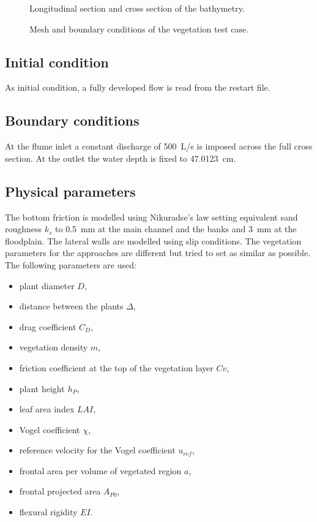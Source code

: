 \begin{figure}[h!]
\centering
{}

\caption{Longitudinal section and cross section of the bathymetry.}
\label{t2d:vegetation:bathy}
\end{figure}

\begin{figure}[h!]
\centering
{}
\caption{Mesh and boundary conditions of the vegetation test case.}
\label{t2d:vegetation:mesh}
\end{figure}

\subsection{Initial condition}

As initial condition, a fully developed flow is read from the restart file.

\subsection{Boundary conditions}

At the flume inlet a constant discharge of 500~L/s is imposed across the full
cross section. At the outlet the water depth is fixed to 47.0123~cm.

\subsection{Physical parameters}

The bottom friction is modelled using Nikuradse's law setting equivalent sand
roughness $k_s$ to 0.5~mm at the main channel and the banks and 3~mm at the floodplain.
The lateral walls are modelled using slip conditions.
The vegetation parameters for the approaches are different but tried to set
as similar as possible. The following parameters are used: 
\begin{itemize}
\item plant diameter $D$, 
\item distance between the plants $\Delta$, 
\item drag coefficient $C_D$, 
\item vegetation density $m$, 
\item friction coefficient at the top of the vegetation layer $Cv$, 
\item plant height $h_P$, 
\item leaf area index $LAI$, 
\item Vogel coefficient $\chi$, 
\item reference velocity for the Vogel coefficient $u_{ref}$, 
\item frontal area per volume of vegetated region $a$, 
\item frontal projected area $A_{P0}$, 
\item flexural rigidity $EI$.
\end{itemize}

